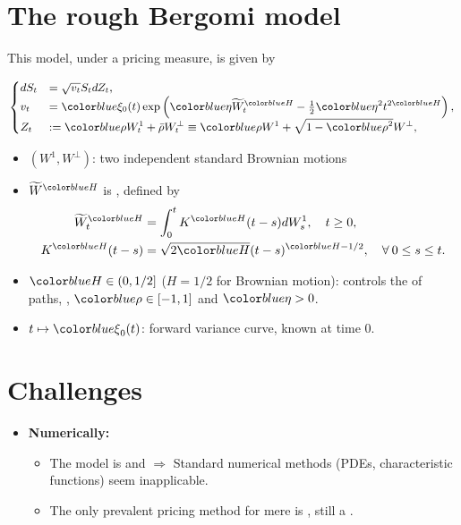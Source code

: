 \documentclass[ima, 20pt, portrait, plainboxedsections]{sciposter}
\begin{document}
\begin{multicols}{3}
\section*{The rough Bergomi model \cite{bayer2016pricing}}
This model, under a pricing measure, is given by
\begin{small}
\begin{equation}
\begin{small}
\begin{cases}
	dS_t &= \sqrt{v_t} S_t dZ_t,\\
v_t &= \blue{\xi_0}(t) \exp\left( \blue{\eta} \widetilde{W}_t^{\blue{H}} - \frac{1}{2} \blue{\eta}^2 t^{2\blue{H}} \right),\\
	Z_t&:=\blue{\rho}	W^1_t+ \bar{\rho}W^\perp_t \equiv \blue{\rho} W^1+\sqrt{1-\blue{\rho}^2} W^\perp,
\end{cases}
\end{small}
\end{equation}
\end{small}
\begin{itemize}
	\item $(W^1,W^\perp)$: two independent standard Brownian motions
	\item $\widetilde{W}^\blue{H} $ is ,  defined by
	\begin{align*}\label{eq:Volterra process}
	\widetilde{W}_t^{\blue{H}} &= \int_0^t K^{\blue{H}}(t-s) dW_s^1, \quad t \ge 0, \\ 	K^{\blue{H}}(t-s) &= \sqrt{2\blue{H}} (t-s)^{\blue{H} - 1/2},\quad \forall \: 0 \le s \le t.
	\end{align*}
	\item $\blue{H} \in(0,1/2]$ ($H=1/2$ for Brownian motion): controls the  of paths, , $\blue{\rho} \in [-1,1]$  and  $\blue{\eta}>0$.
	\item $t \mapsto \blue{\xi}_0(t)$: forward variance curve, known at time $0$.
\end{itemize}
\section*{Challenges}
\begin{itemize}
\item \textbf{Numerically:}
	\begin{itemize}
		\item The model is  and  $\Rightarrow$ Standard numerical methods (PDEs, characteristic functions) seem inapplicable.
		\item The only prevalent pricing method for mere
		 is  \cite{bayer2016pricing,bayer2017regularity,mccrickerd2017turbocharging}, still a .
		

\end{itemize}
\end{itemize}
\end{multicols}
\end{document}
